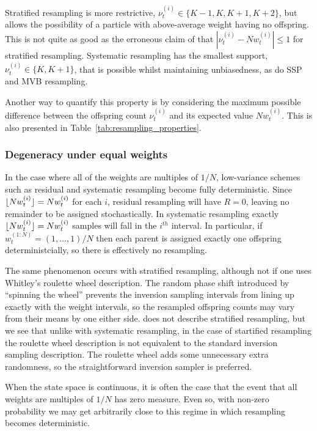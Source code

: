 Stratified resampling is more restrictive, $\nu_t^{(i)} \in \{ K-1, K, K+1, K+2 \}$, but allows the possibility of a particle with above-average weight having no offspring. This is not quite as good as the erroneous claim of \textcite{douc2005} that $| \nu_t^{(i)} - Nw_t^{(i)} | \leq 1$ for stratified resampling.
Systematic resampling has the smallest support, $\nu_t^{(i)} \in \{K, K+1\}$, that is possible whilst maintaining unbiasedness, as do SSP and MVB resampling.

Another way to quantify this property is by considering the maximum possible difference between the offspring count $\nu_t^{(i)}$ and its expected value $N w_t^{(i)}$. This is also presented in Table~\ref{tab:resampling_properties}.




\subsubsection{Degeneracy under equal weights}
In the case where all of the weights are multiples of $1/N$, low-variance schemes such as residual and systematic resampling become fully deterministic. 
Since $\lfloor N w_t^{(i)} \rfloor = Nw_t^{(i)}$ for each $i$, residual resampling will have $R=0$, leaving no remainder to be assigned stochastically. 
In systematic resampling exactly $\lfloor N w_t^{(i)} \rfloor = Nw_t^{(i)}$ samples will fall in the $i^{th}$ interval.
In particular, if $w_t^{(1:N)} = (1,\dots, 1)/N$ then each parent is assigned exactly one offspring deterministcially, so there is effectively no resampling.

The same phenomenon occurs with stratified resampling, although not if one uses Whitley's roulette wheel description. The random phase shift introduced by ``spinning the wheel'' prevents the inversion sampling intervals from lining up exactly with the weight intervals, so the resampled offspring counts may vary from their means by one either side.
\textcite{whitley1994} does not describe stratified resampling, but we see that unlike with systematic resampling, in the case of startified resampling the roulette wheel description is not equivalent to the standard inversion sampling description. 
The roulette wheel adds some unnecessary extra randomness, so the straightforward inversion sampler is preferred.

When the state space is continuous, it is often the case that the event that all weights are multiples of $1/N$ has zero measure. Even so, with non-zero probability we may get arbitrarily close to this regime in which resampling becomes deterministic.




